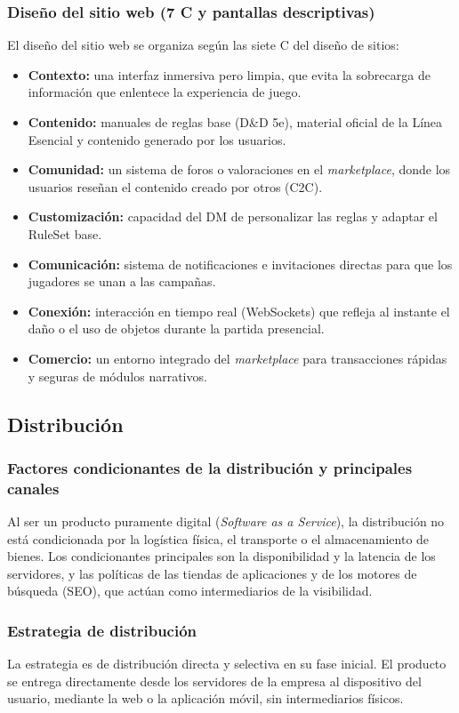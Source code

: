 \subsubsection{Diseño del sitio web (7 C y pantallas descriptivas)}
El diseño del sitio web se organiza según las siete C del diseño de sitios:
\begin{itemize}
  \item \textbf{Contexto:} una interfaz inmersiva pero limpia, que evita la sobrecarga de información que enlentece la experiencia de juego.
  \item \textbf{Contenido:} manuales de reglas base (D\&D 5e), material oficial de la Línea Esencial y contenido generado por los usuarios.
  \item \textbf{Comunidad:} un sistema de foros o valoraciones en el \textit{marketplace}, donde los usuarios reseñan el contenido creado por otros (C2C).
  \item \textbf{Customización:} capacidad del DM de personalizar las reglas y adaptar el RuleSet base.
  \item \textbf{Comunicación:} sistema de notificaciones e invitaciones directas para que los jugadores se unan a las campañas.
  \item \textbf{Conexión:} interacción en tiempo real (WebSockets) que refleja al instante el daño o el uso de objetos durante la partida presencial.
  \item \textbf{Comercio:} un entorno integrado del \textit{marketplace} para transacciones rápidas y seguras de módulos narrativos.
\end{itemize}

\subsection{Distribución}

\subsubsection{Factores condicionantes de la distribución y principales canales}
Al ser un producto puramente digital (\textit{Software as a Service}), la distribución no está condicionada por la logística física, el transporte o el almacenamiento de bienes. Los condicionantes principales son la disponibilidad y la latencia de los servidores, y las políticas de las tiendas de aplicaciones y de los motores de búsqueda (SEO), que actúan como intermediarios de la visibilidad.

\subsubsection{Estrategia de distribución}
La estrategia es de distribución directa y selectiva en su fase inicial. El producto se entrega directamente desde los servidores de la empresa al dispositivo del usuario, mediante la web o la aplicación móvil, sin intermediarios físicos.

